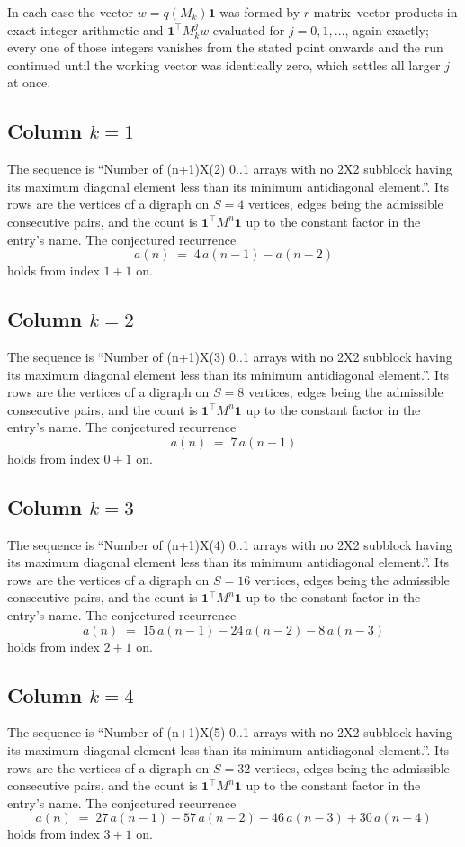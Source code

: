 \documentclass[11pt,a4paper]{article}
\theoremstyle{plain}
\theoremstyle{definition}
\begin{document}
In each case the vector $w=q(M_k)\mathbf{1}$ was formed by $r$ matrix--vector products in
exact integer arithmetic and $\mathbf{1}^{\!\top}M_k^{j}w$ evaluated for $j=0,1,\dots$,
again exactly; every one of those integers vanishes from the stated point onwards and the run
continued until the working vector was identically zero, which settles all larger $j$ at once.

\subsection*{Column $k$$=1$}
The sequence is ``Number of (n+1)X(2) 0..1 arrays with no 2X2 subblock having its maximum diagonal element less than its minimum antidiagonal element.''. Its rows are the vertices of a digraph on
$S=4$ vertices, edges being the admissible consecutive pairs, and the count is
$\mathbf{1}^{\!\top}M^{n}\mathbf{1}$ up to the constant factor in the entry's name.
The conjectured recurrence
\[
a(n)\;=\;4\,a(n-1) - a(n-2)
\]
holds from index $1+1$ on.

\subsection*{Column $k$$=2$}
The sequence is ``Number of (n+1)X(3) 0..1 arrays with no 2X2 subblock having its maximum diagonal element less than its minimum antidiagonal element.''. Its rows are the vertices of a digraph on
$S=8$ vertices, edges being the admissible consecutive pairs, and the count is
$\mathbf{1}^{\!\top}M^{n}\mathbf{1}$ up to the constant factor in the entry's name.
The conjectured recurrence
\[
a(n)\;=\;7\,a(n-1)
\]
holds from index $0+1$ on.

\subsection*{Column $k$$=3$}
The sequence is ``Number of (n+1)X(4) 0..1 arrays with no 2X2 subblock having its maximum diagonal element less than its minimum antidiagonal element.''. Its rows are the vertices of a digraph on
$S=16$ vertices, edges being the admissible consecutive pairs, and the count is
$\mathbf{1}^{\!\top}M^{n}\mathbf{1}$ up to the constant factor in the entry's name.
The conjectured recurrence
\[
a(n)\;=\;15\,a(n-1) - 24\,a(n-2) - 8\,a(n-3)
\]
holds from index $2+1$ on.

\subsection*{Column $k$$=4$}
The sequence is ``Number of (n+1)X(5) 0..1 arrays with no 2X2 subblock having its maximum diagonal element less than its minimum antidiagonal element.''. Its rows are the vertices of a digraph on
$S=32$ vertices, edges being the admissible consecutive pairs, and the count is
$\mathbf{1}^{\!\top}M^{n}\mathbf{1}$ up to the constant factor in the entry's name.
The conjectured recurrence
\[
a(n)\;=\;27\,a(n-1) - 57\,a(n-2) - 46\,a(n-3) + 30\,a(n-4)
\]
holds from index $3+1$ on.
\end{document}
